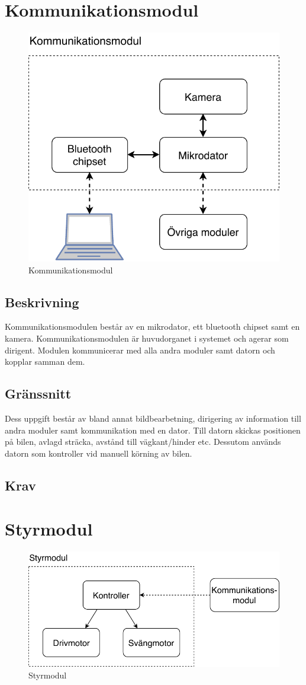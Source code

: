\documentclass[kravspec/krav.tex]{subfiles}
\begin{document}
\clearpage
\section{Kommunikationsmodul}
\begin{figure}[H]
    \centering
    \includegraphics[height=0.4\linewidth]{kravspec/figures/kommunikationsmodul.pdf}
    \caption{Kommunikationsmodul}
    \label{fig:kommunikationsmodul}
\end{figure}

\subsection{Beskrivning}
Kommunikationsmodulen består av en mikrodator, ett bluetooth chipset samt en
kamera. Kommunikationsmodulen är huvudorganet i systemet och agerar som
dirigent. Modulen kommunicerar med alla andra moduler samt datorn och kopplar
samman dem.

\subsection{Gränssnitt}
Dess uppgift består av bland annat bildbearbetning, dirigering av information
till andra moduler samt kommunikation med en dator. Till datorn skickas
positionen på bilen, avlagd sträcka, avstånd till vägkant/hinder etc. Dessutom
används datorn som kontroller vid manuell körning av bilen.

\subsection{Krav}
\begin{reqlist}
    \req{}
\end{reqlist}

\clearpage
\section{Styrmodul}
\begin{figure}[h]
    \centering
    \includegraphics[width=0.6\linewidth]{kravspec/figures/styrmodul.pdf}
    \caption{Styrmodul}
    \label{fig:styrmodul}
\end{figure}
\end{document}
